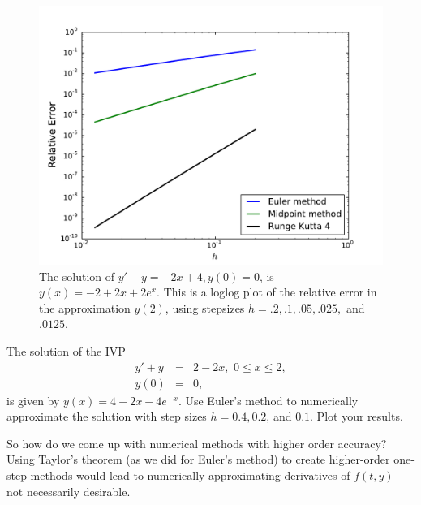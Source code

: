 \begin{figure}[ht]
\centering
\includegraphics[width=\textwidth]{Fig3.pdf}
\caption{The solution of $y' -y= -2x+4, y(0) = 0$, is $y(x) = -2+2x + 2e^x.$ This is a loglog plot of the relative error in the approximation $y(2)$, using stepsizes $h = .2, .1, .05, .025,$ and $.0125$.}
\label{ivp:euler}
\end{figure}



\begin{problem}
The solution of the IVP
\begin{eqnarray*}
y' + y &=& 2-2x,\,\, 0 \leq x \leq 2, \\
y(0) &=& 0,
\end{eqnarray*}
is given by $y(x) = 4-2x -4e^{-x}$. 
Use Euler's method to numerically approximate the solution with step sizes $h = 0.4, 0.2$, and $0.1.$ Plot your results.
\end{problem}



So how do we come up with numerical methods with higher order accuracy? Using Taylor's theorem (as we did for Euler's method) to create higher-order one-step methods would lead to numerically approximating derivatives of $f(t,y)$ - not necessarily desirable. 

